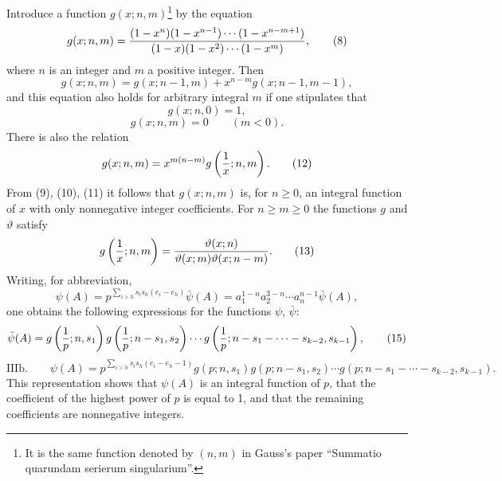 \documentclass[11pt,a4paper]{article}
\newcommand{\tht}{\vartheta}
\begin{document}
Introduce a function $g(x;n,m)$\footnote{It is the same function denoted by $(n,m)$ in Gauss's paper ``Summatio quarundam serierum singularium''.} by the equation
\begin{equation}
 g(x;n,m)=
 { (1-x^n)(1-x^{n-1})\cdots(1-x^{n-m+1})
 \over
 (1-x)(1-x^2)\cdots(1-x^m) },
\tag{8}
\end{equation}
where $n$ is an integer and $m$ a positive integer. Then
\begin{equation}
 g(x;n,m)=g(x;n-1,m)+x^{n-m}g(x;n-1,m-1),
\tag{9}
\end{equation}
and this equation also holds for arbitrary integral $m$ if one stipulates that
\begin{equation}
 g(x;n,0)=1,
\tag{10}
\end{equation}
\begin{equation}
 g(x;n,m)=0\qquad (m<0).
\tag{11}
\end{equation}
There is also the relation
\begin{equation}
 g(x;n,m)=x^{m(n-m)}g\left({1\over x};n,m\right).
\tag{12}
\end{equation}
From (9), (10), (11) it follows that $g(x;n,m)$ is, for $n\ge0$, an integral function of $x$ with only nonnegative integer coefficients. For $n\ge m\ge0$ the functions $g$ and $\tht$ satisfy
\begin{equation}
 g\left({1\over x};n,m\right)={\tht(x;n)\over\tht(x;m)\tht(x;n-m)}.
\tag{13}
\end{equation}
Writing, for abbreviation,
\begin{equation}
 \psi(A)=p^{\sum_{i>h}s_i s_h(e_i-e_h)}\bar\psi(A)
 =a_1^{1-n}a_2^{3-n}\cdots a_n^{n-1}\bar\psi(A),
\tag{14}
\end{equation}
one obtains the following expressions for the functions $\psi$, $\bar\psi$:
\begin{equation}
 \bar\psi(A)=
 g\left({1\over p};n,s_1\right)
 g\left({1\over p};n-s_1,s_2\right)
 \cdots
 g\left({1\over p};n-s_1-\cdots-s_{k-2},s_{k-1}\right),
\tag{15}
\end{equation}
\begin{equation}
\text{IIIb.}\qquad
 \psi(A)=p^{\sum_{i>h}s_i s_h(e_i-e_h-1)}
 g(p;n,s_1)g(p;n-s_1,s_2)\cdots
 g(p;n-s_1-\cdots-s_{k-2},s_{k-1}).
\tag{16}
\end{equation}
This representation shows that $\psi(A)$ is an integral function of $p$, that the coefficient of the highest power of $p$ is equal to 1, and that the remaining coefficients are nonnegative integers.
\end{document}
